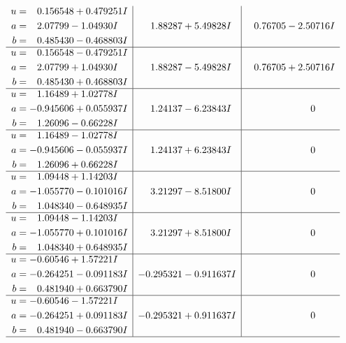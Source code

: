 \documentclass[1p]{elsarticle_modified}
\theoremstyle{definition}
\begin{document}
$$\begin{array}{c|c|c}
\begin{aligned}
u &= \phantom{-}0.156548 + 0.479251 I \\
a &= \phantom{-}2.07799 - 1.04930 I \\
b &= \phantom{-}0.485430 - 0.468803 I\end{aligned}
 & \phantom{-}1.88287 + 5.49828 I & \phantom{-}0.76705 - 2.50716 I \\ \hline\begin{aligned}
u &= \phantom{-}0.156548 - 0.479251 I \\
a &= \phantom{-}2.07799 + 1.04930 I \\
b &= \phantom{-}0.485430 + 0.468803 I\end{aligned}
 & \phantom{-}1.88287 - 5.49828 I & \phantom{-}0.76705 + 2.50716 I \\ \hline\begin{aligned}
u &= \phantom{-}1.16489 + 1.02778 I \\
a &= -0.945606 + 0.055937 I \\
b &= \phantom{-}1.26096 - 0.66228 I\end{aligned}
 & \phantom{-}1.24137 - 6.23843 I & \phantom{-0.000000 } 0 \\ \hline\begin{aligned}
u &= \phantom{-}1.16489 - 1.02778 I \\
a &= -0.945606 - 0.055937 I \\
b &= \phantom{-}1.26096 + 0.66228 I\end{aligned}
 & \phantom{-}1.24137 + 6.23843 I & \phantom{-0.000000 } 0 \\ \hline\begin{aligned}
u &= \phantom{-}1.09448 + 1.14203 I \\
a &= -1.055770 - 0.101016 I \\
b &= \phantom{-}1.048340 - 0.648935 I\end{aligned}
 & \phantom{-}3.21297 - 8.51800 I & \phantom{-0.000000 } 0 \\ \hline\begin{aligned}
u &= \phantom{-}1.09448 - 1.14203 I \\
a &= -1.055770 + 0.101016 I \\
b &= \phantom{-}1.048340 + 0.648935 I\end{aligned}
 & \phantom{-}3.21297 + 8.51800 I & \phantom{-0.000000 } 0 \\ \hline\begin{aligned}
u &= -0.60546 + 1.57221 I \\
a &= -0.264251 - 0.091183 I \\
b &= \phantom{-}0.481940 + 0.663790 I\end{aligned}
 & -0.295321 - 0.911637 I & \phantom{-0.000000 } 0 \\ \hline\begin{aligned}
u &= -0.60546 - 1.57221 I \\
a &= -0.264251 + 0.091183 I \\
b &= \phantom{-}0.481940 - 0.663790 I\end{aligned}
 & -0.295321 + 0.911637 I & \phantom{-0.000000 } 0\\
 \hline 
 \end{array}$$\newpage\newpage\renewcommand{\arraystretch}{1}
\end{document}
